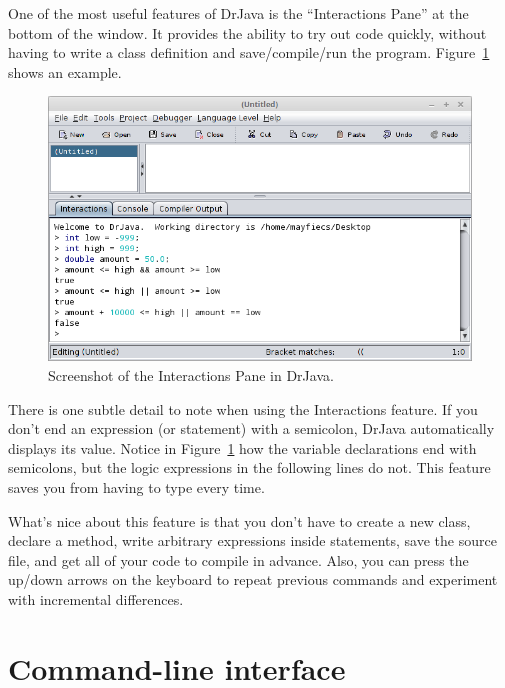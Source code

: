 One of the most useful features of DrJava is the ``Interactions Pane'' at the bottom of the window.
It provides the ability to try out code quickly, without having to write a class definition and save/compile/run the program.
Figure~\ref{fig.drjava2} shows an example.

\begin{figure}[!ht]
\begin{center}
\includegraphics[width=\textwidth]{figs/drjava-logic.png}
\caption{Screenshot of the Interactions Pane in DrJava.}
\label{fig.drjava2}
\end{center}
\end{figure}

There is one subtle detail to note when using the Interactions feature.
If you don't end an expression (or statement) with a semicolon, DrJava automatically displays its value.
Notice in Figure~\ref{fig.drjava2} how the variable declarations end with semicolons, but the logic expressions in the following lines do not.
This feature saves you from having to type  every time.

What's nice about this feature is that you don't have to create a new class, declare a  method, write arbitrary expressions inside  statements, save the source file, and get all of your code to compile in advance.
Also, you can press the up/down arrows on the keyboard to repeat previous commands and experiment with incremental differences.


\section{Command-line interface}
\label{commandline}

